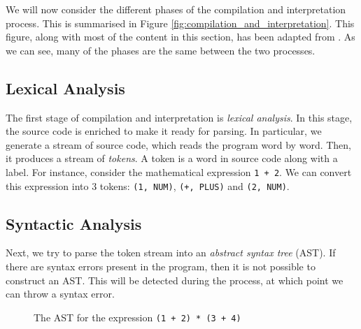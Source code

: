 We will now consider the different phases of the compilation and interpretation process. This is summarised in Figure \ref{fig:compilation_and_interpretation}. This figure, along with most of the content in this section, has been adapted from \citet{aho2007compilers}. As we can see, many of the phases are the same between the two processes.

\subsection{Lexical Analysis}    
The first stage of compilation and interpretation is \emph{lexical analysis}. In this stage, the source code is enriched to make it ready for parsing. In particular, we generate a stream of source code, which reads the program word by word. Then, it produces a stream of \emph{tokens}. A token is a word in source code along with a label. For instance, consider the mathematical expression \texttt{1 + 2}. We can convert this expression into 3 tokens: \texttt{(1, NUM)}, \texttt{(+, PLUS)} and \texttt{(2, NUM)}. 

\subsection{Syntactic Analysis}

Next, we try to parse the token stream into an \emph{abstract syntax tree} (AST). If there are syntax errors present in the program, then it is not possible to construct an AST. This will be detected during the process, at which point we can throw a syntax error.

\begin{figure}[htb]
    \centering
    \caption{The AST for the expression \texttt{(1 + 2) * (3 + 4)}}
    \label{fig:AST_example}
\end{figure}

